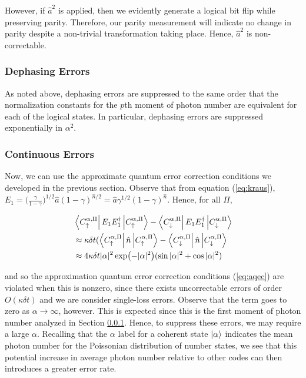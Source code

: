 \documentclass[12]{amsart}
\newcommand\0{\mathbf{0}}
\newcommand\<{\langle}
\renewcommand\>{\rangle}
\begin{document}
However, if $\hat{a}^2$ is applied, then we evidently generate a logical bit flip while preserving parity. Therefore, our parity measurement will indicate no change in parity despite a non-trivial transformation taking place. Hence, $\hat{a}^2$ is non-correctable.

\subsubsection{Dephasing Errors}
\label{sec:cat-deph}

As noted above, dephasing errors are suppressed to the same order that the normalization constants for the $p$th moment of photon number are equivalent for each of the logical states. In particular, dephasing errors are suppressed exponentially in $\alpha^2$.

\subsubsection{Continuous Errors}

Now, we can use the approximate quantum error correction conditions we developed in the previous section. Observe that from equation (\ref{eq:kraus}), $E_1 = \Big(\frac{\gamma}{1-\gamma}\Big)^{1 / 2} \hat{a} (1 - \gamma)^{\hat{n} / 2} = \hat{a} \gamma^{1/2} (1- \gamma)^{\hat{n}}$. Hence, for all $\Pi$,

\begin{align*}
&\bra{C^{\alpha, \Pi}_{\uparrow}}E_1E_1^\dag\ket{C^{\alpha, \Pi}_{\uparrow}} - \bra{C^{\alpha, \Pi}_{\downarrow}}	E_1E_1^\dag\ket{C^{\alpha, \Pi}_{\downarrow}}	\\
&\approx \kappa\delta t (\bra{C^{\alpha, \Pi}_{\uparrow}}\hat{n}\ket{C^{\alpha, \Pi}_{\uparrow}} - \bra{C^{\alpha, \Pi}_{\downarrow}}	\hat{n}\ket{C^{\alpha, \Pi}_{\downarrow}}\\
&\approx 4 \kappa \delta t |\alpha|^2  \exp(-|\alpha|^2)(\sin |\alpha|^2 + \cos|\alpha|^2)
\end{align*}

and so the approximation quantum error correction conditions (\ref{eq:aqec}) are violated when this is nonzero, since there exists uncorrectable errors of order $O(\kappa \delta t)$ and we are consider single-loss errors. Observe that the term goes to zero as $\alpha\rightarrow \infty$, however. This is expected since this is the first moment of photon number analyzed in Section \ref{sec:cat-deph}. Hence, to suppress these errors, we may require a large $\alpha$. Recalling that the $\alpha$ label for a coherent state $\ket{\alpha}$ indicates the mean photon number for the Poissonian distribution of number states, we see that this potential increase in average photon number relative to other codes can then introduces a greater error rate.
\end{document}
